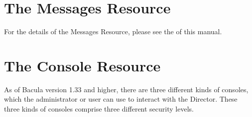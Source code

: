 \section{The Messages Resource}
\label{MessagesResource2}

For the details of the Messages Resource, please see the 
 of this
manual. 

\section{The Console Resource}
\label{ConsoleResource1}

As of Bacula version 1.33 and higher, there are three different kinds of
consoles, which the administrator or user can use to interact with the
Director. These three kinds of consoles comprise three different security
levels. 


